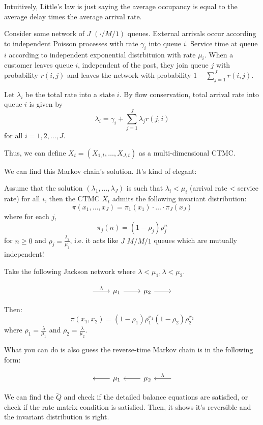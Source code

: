 Intuitively, Little's law is just saying the average occupancy is equal to the average delay times the average arrival rate.

\begin{definition}
    Consider some network of $J$ $(\cdot/M/1)$ queues. External arrivals occur according to independent Poisson processes with rate $\gamma_i$ into queue $i$.
    Service time at queue $i$ according to independent exponential distrbituion with rate $\mu_i$. When a customer leaves queue $i$, independent of the past,
    they join queue $j$ with probability $r(i, j)$ and leaves the network with probability $1 - \sum_{j = 1}^J r(i, j)$.

    Let $\lambda_i$ be the total rate into a state $i$. By flow conservation, total arrival rate into queue $i$ is given by
    \[ \lambda_i = \gamma_i + \sum_{j = 1}^J \lambda_j r(j, i) \]
    for all $i = 1, 2, \dots, J$.

    Thus, we can define $X_t = (X_{1, t}, \dots, X_{J, t})$ as a multi-dimensional CTMC.
\end{definition}

We can find this Markov chain's solution. It's kind of elegant:

\begin{theorem}
    Assume that the solution $(\lambda_1, \dots, \lambda_J)$ is such that $\lambda_i < \mu_i$ (arrival rate < service rate) for all $i$, then
    the CTMC $X_t$ admits the following invariant distribution:
    \[ \pi(x_1, \dots, x_J) = \pi_1(x_1) \cdot \dots \cdot \pi_J(x_J) \]
    where for each $j$,
    \[ \pi_j(n) = (1 - \rho_j)\rho_j^n \]
    for $n \geq 0$ and $\rho_j = \frac{\lambda_j}{\mu_j}$, i.e. it acts like $J$ $M/M/1$ queues which are mutually independent!
\end{theorem}

\begin{example}
    Take the following Jackson network where $\lambda < \mu_1, \lambda < \mu_2$.

    \[\begin{tikzcd}
        {} & \mu_1 & \mu_2 & {}
        \arrow["\lambda", from=1-1, to=1-2]
        \arrow["", from=1-2, to=1-3]
        \arrow["", from=1-3, to=1-4]
    \end{tikzcd}\]

    Then:
    \[ \pi(x_1, x_2) = (1 - \rho_1) \rho_1^{x_1} (1 - \rho_2) \rho_2^{x_2} \]
    where $\rho_1 = \frac{\lambda}{\mu_1}$ and $\rho_2 = \frac{\lambda}{\mu_2}$.

    What you can do is also guess the reverse-time Markov chain is in the following form:

    \[\begin{tikzcd}
        {} & \mu_1 & \mu_2 & {}
        \arrow["", from=1-2, to=1-1]
        \arrow["", from=1-3, to=1-2]
        \arrow["{\lambda}"', from=1-4, to=1-3]
    \end{tikzcd}\]

    We can find the $\tilde{Q}$ and check if the detailed balance equations are satisfied, or check
    if the rate matrix condition is satisfied. Then, it shows it's reversible and the invariant distribution is right.
\end{example}

